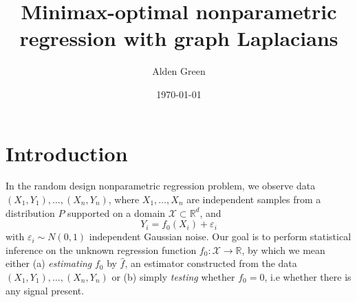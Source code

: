 \documentclass{article}
\newcommand{\Reals}{\mathbb{R}}
\newcommand{\1}{\mathbf{1}}
\newcommand{\Rd}{\Reals^d}
\newcommand{\Xset}{\mathcal{X}}
\newcommand{\wh}[1]{\widehat{#1}}
\theoremstyle{alden}
\theoremstyle{aldenthm}
\theoremstyle{definition}
\theoremstyle{remark}
\begin{document}
\title{Minimax-optimal nonparametric regression with graph Laplacians}
\author{Alden Green}
\date{\today}
\maketitle

\section{Introduction}
\label{sec:introduction}

In the random design nonparametric regression problem, we observe data $(X_1,Y_1),\ldots,(X_n,Y_n)$, where $X_1,\ldots,X_n$ are independent samples from a distribution $P$ supported on a domain $\Xset \subset \Rd$, and 
\begin{equation}
\label{eqn:random_design_regression}
Y_i = f_0(X_i) + \varepsilon_i
\end{equation}
with $\varepsilon_i \sim N(0,1)$ independent Gaussian noise. Our goal is to perform statistical inference on the unknown regression function $f_0: \Xset \to \Reals$, by which we mean either (a) \emph{estimating} $f_0$ by $\wh{f}$, an estimator constructed from the data $(X_1,Y_1),\ldots,(X_n,Y_n)$ or (b) simply \emph{testing} whether $f_0 = 0$, i.e whether there is any signal present. 
\end{document}
